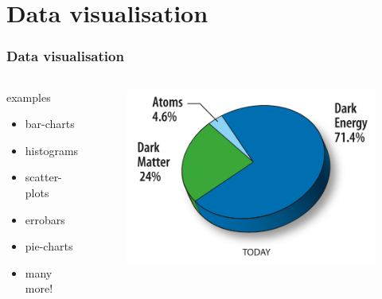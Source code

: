 \documentclass[10pt, compress]{beamer}
\begin{document}
\section{Data visualisation}

\begin{frame}
    \frametitle{Data visualisation}
    \begin{columns}
        \begin{block}{examples}
            \begin{itemize}
                \item{bar-charts}
                \item{histograms}
                \item{scatter-plots}
                \item{errobars}
                \item{pie-charts}
                \item{many more!}
            \end{itemize}
        \end{block}
        \begin{block}{}
            \begin{figure}
                \begin{center}
                    \includegraphics[scale=0.2]{img/121236_NewPieCharts720.png}
                \end{center}
            \end{figure}
        \end{block}
    \end{columns}
\end{frame}
\end{document}

